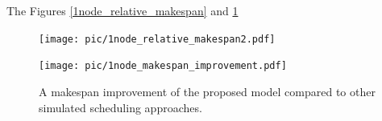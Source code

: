 \documentclass{svjour3}                     %
\begin{document}
The Figures \ref{1node_relative_makespan} and \ref{1node_makespan_improvement} 
%
\begin{figure}
\centering
\begin{minipage}{1\textwidth}
\centering
    \texttt{[image: pic/1node\_relative\_makespan2.pdf]}
    \caption{Dependence of the data production makespan on the network bandwidth using a single remote node. %
    The makespan is given in units equal to 9 days, 15 hours, 39 minutes and 13 seconds which is the makespan of the no\_network approach.}
    \label{1node_relative_makespan}
\end{minipage}\hspace{3mm}%

\begin{minipage}{1\textwidth}
\centering
    \texttt{[image: pic/1node\_makespan\_improvement.pdf]}
    \caption{A makespan improvement of the proposed model compared to other simulated scheduling approaches. %
    }
    \label{1node_makespan_improvement}
\end{minipage} 
\end{figure}
%
\end{document}
